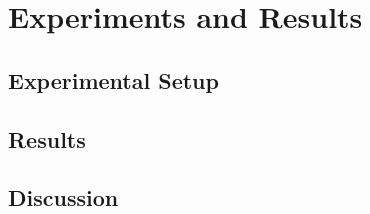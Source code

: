 \section{Experiments and Results}
\label{sec:experiments}

\subsection{Experimental Setup}

\subsection{Results}

\subsection{Discussion}
